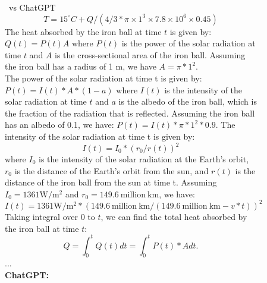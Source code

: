 \begin{figure}[H]
\begin{AIbox}{\DV \ vs ChatGPT}
{$$T = 15^\circ C + Q / (4/3 * \pi \times 1^3 \times 7.8 \times 10^6 \times 0.45)$$
The heat absorbed by the iron ball at time $t$ is given by: $Q(t) = P(t) A$ where $P(t)$ is the power of the solar radiation at time $t$ and $A$ is the cross-sectional area of the iron ball. Assuming the iron ball has a radius of 1 m, we have $A = \pi * 1^2$.\\
The power of the solar radiation at time t is given by:
$P(t) = I(t) * A * (1 - a)$
where $I(t)$ is the intensity of the solar radiation at time $t$ and $a$ is the albedo of the iron ball, which is the fraction of the radiation that is reflected. Assuming the iron ball has an albedo of 0.1, we have:
$P(t) = I(t) * \pi * 1^2 * 0.9$.
The intensity of the solar radiation at time t is given by:
$$I(t) = I_0 * (r_0 / r(t))^2$$
where $I_0$ is the intensity of the solar radiation at the Earth's orbit, $r_0$ is the distance of the Earth's orbit from the sun, and $r(t)$ is the distance of the iron ball from the sun at time t. Assuming $I_0 = 1361  \mathrm{W}/\mathrm{m}^2$ and $r_0 = 149.6 \mathrm{\ million\ km}$, we have:
$$I(t) = 1361 \mathrm{W}/\mathrm{m}^2 * (149.6 \mathrm{\ million\ km} / (149.6 \mathrm{\ million\ km} - v * t))^2$$
Taking integral over $0$ to $t$, we can find the total heat absorbed by the iron ball at time $t$:
$$Q = \int_0^t Q(t) dt = \int_0^t P(t) * A dt.$$
...
}\\
{\bf ChatGPT:} \\
{\scriptsize
}
\end{AIbox}
\end{figure}
